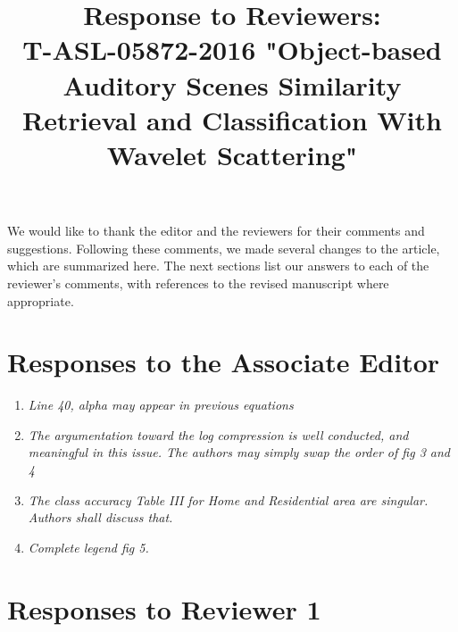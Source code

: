 \documentclass[10pt]{article}
\title{Response to Reviewers: \\ T-ASL-05872-2016 "Object-based Auditory Scenes Similarity Retrieval and Classification With Wavelet Scattering"}
\begin{document}
\maketitle

We would like to thank the editor and the reviewers for their comments and suggestions. Following these comments, we made several changes to the article, which are summarized here. The next sections list our answers to each of the reviewer’s comments, with references to the revised manuscript where appropriate.

\section{Responses to the Associate Editor}

\begin{enumerate}

\item \emph{Line 40, alpha may appear in previous equations}

\item \emph{The argumentation toward the log compression is well conducted, and meaningful in this issue. The authors may simply swap the order of fig 3 and 4}

\item \emph{The class accuracy Table III for Home and Residential area are singular. Authors shall discuss that.}

\item \emph{Complete legend fig 5.}

\end{enumerate}

\section{Responses to Reviewer 1}
\end{document}
